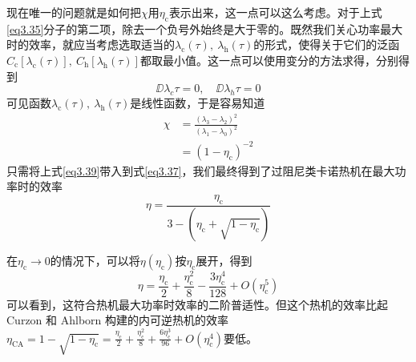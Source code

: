 现在唯一的问题就是如何把$\chi$用$\eta_{\mathrm{c}}$表示出来，这一点可以这么考虑。对于上式\eqref{eq3.35}分子的第二项，除去一个负号外始终是大于零的。既然我们关心功率最大时的效率，就应当考虑选取适当的$\lambda_{\mathrm{c}}(\tau),\ \lambda_{\mathrm{h}}(\tau)$的形式，使得关于它们的泛函$C_{\mathrm{c}} [\lambda_{\mathrm{c}}(\tau)],\ C_{\mathrm{h}} [\lambda_{\mathrm{h}}(\tau)]$都取最小值。这一点可以使用变分的方法求得，分别得到
\begin{equation}
    \DD{\lambda_{c}}{\tau}=0,\quad \DD{\lambda_{h}}{\tau}=0
    \label{eq3.38}
\end{equation}
可见函数$\lambda_{\mathrm{c}}(\tau),\ \lambda_{\mathrm{h}}(\tau)$是线性函数，于是容易知道
\begin{equation}
    \begin{split}
        \chi&=\frac{{\left(\lambda_3 - \lambda_2\right)}^2}{{\left(\lambda_1 - \lambda_0\right)}^2}\\
        &= {(1-\eta_{\mathrm{c}})}^{-2}
    \end{split}
    \label{eq3.39}
\end{equation}
只需将上式\eqref{eq3.39}带入到式\eqref{eq3.37}，我们最终得到了过阻尼类卡诺热机在最大功率时的效率
\begin{equation}
    \eta=\frac{\eta_{\mathrm{c}}}{3-\left(\eta_{\mathrm{c}}+\sqrt{1-\eta_{\mathrm{c}}}\right)}
    \label{eq3.40}
\end{equation}

在$\eta_{\mathrm{c}} \to 0$的情况下，可以将$\eta(\eta_{\mathrm{c}})$按$\eta_{\mathrm{c}}$展开，得到
\begin{equation}
    \eta = \frac{\eta_{\mathrm{c}}}{2}+\frac{\eta_{\mathrm{c}}^2}{8}-\frac{3 \eta_{\mathrm{c}}^4}{128}+O\left(\eta_{\mathrm{c}}^5\right)
    \label{eq3.41}
\end{equation}
可以看到，这符合热机最大功率时效率的二阶普适性。但这个热机的效率比起Curzon 和 Ahlborn 构建的内可逆热机\cite{Curzon1975}的效率$\eta_{\mathrm{CA}}=1-\sqrt{1-\eta_{\mathrm{c}}}=\frac{\eta_{\mathrm{c}}}{2}+\frac{\eta_{\mathrm{c}}^{2}}{8}+\frac{6 \eta_{\mathrm{c}}^{3}}{96}+O\left(\eta_{\mathrm{c}}^{4}\right)$要低。



